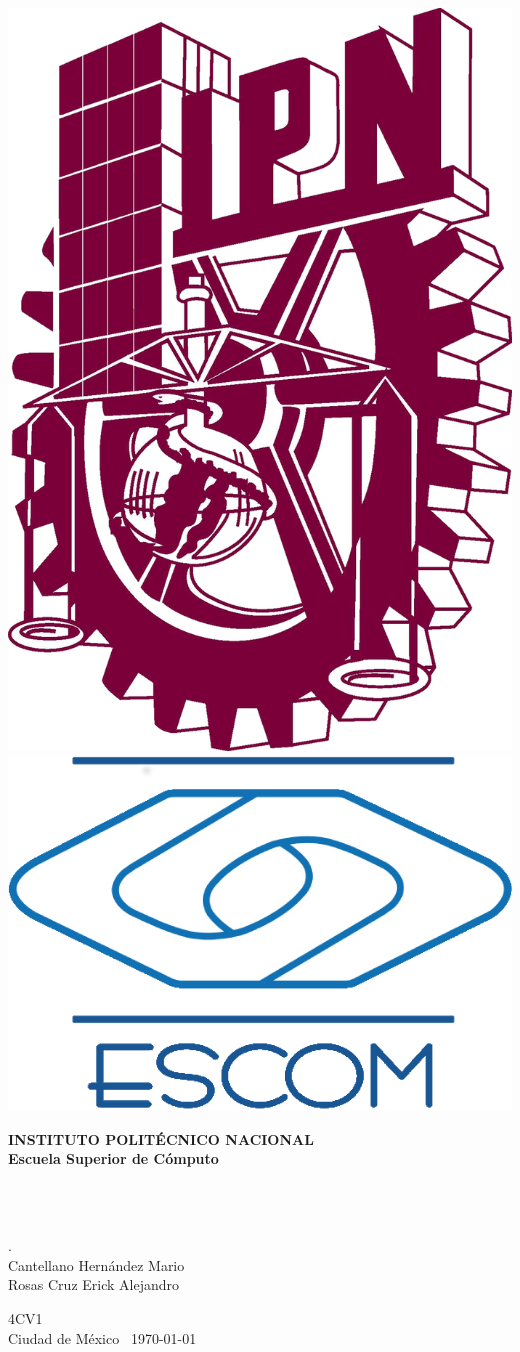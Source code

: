 \thispagestyle{empty}
\begin{center}  
  \includegraphics[height=1.20 in]{./image/title-page/IPN.png}
  \hspace{3.85 in}
	\includegraphics[height=1.20 in]{./image/title-page/ESCOM.png}
	\vspace{0.05 in}
	
	\begin{LARGE} \bf
		INSTITUTO POLIT\'ECNICO NACIONAL\\[6 pt]
		Escuela Superior de Cómputo\\[30 pt]
	\end{LARGE}
	\vfill
	\begin{Large} \em
		\nameSubject\\[6 pt]
		\nameProfessor\\[30 pt]
	\end{Large}
  \vfill	
	\begin{large}
		\nameDoc.\\[30 pt]
		Cantellano Hern\'andez Mario\\[6 pt]
		Rosas Cruz Erick Alejandro\\[30 pt]
	\end{large}
	4CV1\\[12 pt]
	\vfill
	Ciudad de M\'exico\ \hspace{2.75 in} \dmy\today
\end{center}

